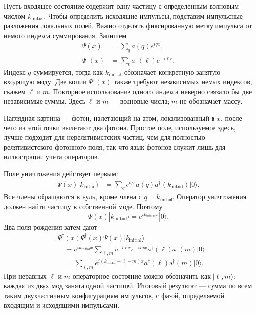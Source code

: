Пусть входящее состояние содержит одну частицу с определенным волновым числом \(k_{\mathrm{initial}}\). Чтобы определить исходящие импульсы, подставим импульсные разложения локальных полей. Важно отделять фиксированную метку импульса от немого индекса суммирования. Запишем
\begin{align}
\Psi(x)&=\sum_q a(q)e^{iqx},\\
\Psi^\dagger(x)&=\sum_\ell a^\dagger(\ell)e^{-i\ell x}.
\end{align}
Индекс \(q\) суммируется, тогда как \(k_{\mathrm{initial}}\) обозначает конкретную занятую входящую моду. Две копии \(\Psi^\dagger(x)\) также требуют независимых немых индексов, скажем \(\ell\) и \(m\). Повторное использование одного индекса неверно связало бы две независимые суммы. Здесь \(\ell\) и \(m\) — волновые числа; \(m\) не обозначает массу.

Наглядная картина — фотон, налетающий на атом, локализованный в \(x\), после чего из этой точки вылетают два фотона. Простое поле, используемое здесь, лучше подходит для нерелятивистских частиц, чем для полностью релятивистского фотонного поля, так что язык фотонов служит лишь для иллюстрации учета операторов.

Поле уничтожения действует первым:
\begin{align}
\Psi(x)|k_{\mathrm{initial}}\rangle
&=\sum_q e^{iqx}a(q)a^\dagger(k_{\mathrm{initial}})|0\rangle.
\end{align}
Все члены обращаются в нуль, кроме члена с \(q=k_{\mathrm{initial}}\). Оператор уничтожения должен найти частицу в собственной моде. Поэтому
\begin{equation}
\Psi(x)|k_{\mathrm{initial}}\rangle
=e^{ik_{\mathrm{initial}}x}|0\rangle.
\end{equation}
Два поля рождения затем дают
\begin{align}
&\Psi^\dagger(x)\Psi^\dagger(x)\Psi(x)
|k_{\mathrm{initial}}\rangle
\\
&\quad=
e^{ik_{\mathrm{initial}}x}
\sum_{\ell,m}
e^{-i\ell x}e^{-imx}
a^\dagger(\ell)a^\dagger(m)|0\rangle
\\
&\quad=
\sum_{\ell,m}
e^{i(k_{\mathrm{initial}}-\ell-m)x}
a^\dagger(\ell)a^\dagger(m)|0\rangle.
\end{align}
При неравных \(\ell\) и \(m\) операторное состояние можно обозначить как \(|\ell,m\rangle\): каждая из двух мод занята одной частицей. Итоговый результат — сумма по всем таким двухчастичным конфигурациям импульсов, с фазой, определяемой входящим и исходящими импульсами.

